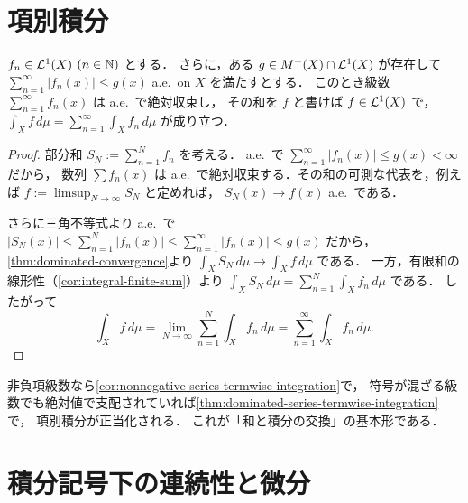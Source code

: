 \section{項別積分}

\begin{theorem}[優収束定理による項別積分]\label{thm:dominated-series-termwise-integration}
$f_n\in\mathcal L^1(X)$ $(n\in\mathbb N)$ とする．
さらに，ある $g\in M^+(X)\cap\mathcal L^1(X)$ が存在して
$\sum_{n=1}^{\infty}|f_n(x)|\le g(x)$ a.e.\ on $X$ を満たすとする．
このとき級数 $\sum_{n=1}^{\infty}f_n(x)$ は a.e.\ で絶対収束し，
その和を $f$ と書けば $f\in\mathcal L^1(X)$ で，
$\int_X f\,d\mu=\sum_{n=1}^{\infty}\int_X f_n\,d\mu$ が成り立つ．
\end{theorem}
\begin{proof}
部分和 $S_N:=\sum_{n=1}^N f_n$ を考える．
a.e.\ で $\sum_{n=1}^{\infty}|f_n(x)|\le g(x)<\infty$ だから，
数列 $\sum f_n(x)$ は a.e.\ で絶対収束する．その和の可測な代表を，例えば $f:=\limsup_{N\to\infty} S_N$ と定めれば，
$S_N(x)\to f(x)$ a.e.\ である．

さらに三角不等式より
a.e.\ で $|S_N(x)|\le\sum_{n=1}^N |f_n(x)|\le\sum_{n=1}^{\infty}|f_n(x)|\le g(x)$ だから，
\cref{thm:dominated-convergence}より $\int_X S_N\,d\mu\to \int_X f\,d\mu$ である．
一方，有限和の線形性（\cref{cor:integral-finite-sum}）より
$\int_X S_N\,d\mu=\sum_{n=1}^N \int_X f_n\,d\mu$ である．
したがって
\[
\int_X f\,d\mu
=\lim_{N\to\infty}\sum_{n=1}^N \int_X f_n\,d\mu
=\sum_{n=1}^{\infty}\int_X f_n\,d\mu.
\]
\end{proof}

\begin{remark}
非負項級数なら\cref{cor:nonnegative-series-termwise-integration}で，
符号が混ざる級数でも絶対値で支配されていれば\cref{thm:dominated-series-termwise-integration}で，
項別積分が正当化される．
これが「和と積分の交換」の基本形である．
\end{remark}

\section{積分記号下の連続性と微分}

